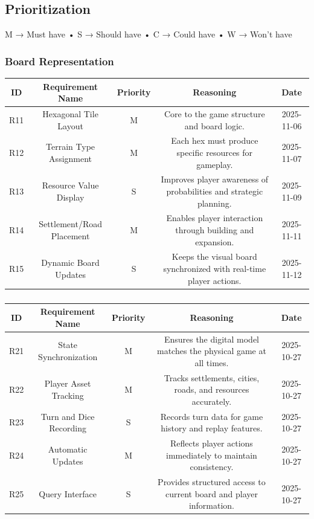 \documentclass{article}
\begin{document}
\subsection{Prioritization}\label{subsec:prioritization}
M → Must have
• S → Should have
• C → Could have
• W → Won't have 

\subsubsection*{Board Representation}

\begin{tabular}{|c|c|c|c|c|}
\hline
\textbf{ID} & \textbf{Requirement Name} & \textbf{Priority} &
\textbf{Reasoning} & \textbf{Date} \\
\hline
R11 & Hexagonal Tile Layout & M &
\parbox[t]{4cm}{Core to the \emph{\Catan{}} game structure and board logic.} &
2025-11-06 \\
\hline
R12 & Terrain Type Assignment & M &
\parbox[t]{4cm}{Each hex must produce specific resources for gameplay.} &
2025-11-07 \\
\hline
R13 & Resource Value Display & S &
\parbox[t]{4cm}{Improves player awareness of probabilities and
strategic planning.} &
2025-11-09 \\
\hline
R14 & Settlement/Road Placement & M &
\parbox[t]{4cm}{Enables player interaction through building and
expansion.} &
2025-11-11 \\
\hline
R15 & Dynamic Board Updates & S &
\parbox[t]{4cm}{Keeps the visual board synchronized with real-time
player actions.} &
2025-11-12 \\
\hline
\end{tabular}

\vspace{1em}

\subsubsection*{\GameState{} \DigitalTwin{}}

\begin{tabular}{|c|c|c|c|c|}
\hline
\textbf{ID} & \textbf{Requirement Name} & \textbf{Priority} &
\textbf{Reasoning} & \textbf{Date} \\
\hline
R21 & State Synchronization & M &
\parbox[t]{4cm}{Ensures the digital model matches the physical game
at all times.} &
2025-10-27 \\
\hline
R22 & Player Asset Tracking & M &
\parbox[t]{4cm}{Tracks settlements, cities, roads, and resources
accurately.} &
2025-10-27 \\
\hline
R23 & Turn and Dice Recording & S &
\parbox[t]{4cm}{Records turn data for game history and replay
features.} &
2025-10-27 \\
\hline
R24 & Automatic Updates & M &
\parbox[t]{4cm}{Reflects player actions immediately to maintain
consistency.} &
2025-10-27 \\
\hline
R25 & Query Interface & S &
\parbox[t]{4cm}{Provides structured access to current board and
player information.} &
2025-10-27 \\
\hline
\end{tabular}
\end{document}

